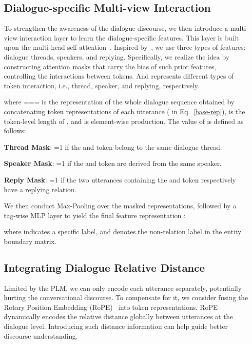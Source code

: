 \documentclass[11pt]{article}
\begin{document}
\vspace{-5pt}
\subsection{Dialogue-specific Multi-view Interaction}

To strengthen the awareness of the dialogue discourse, we then introduce a multi-view interaction layer to learn the dialogue-specific features.
This layer is built upon the multi-head self-attention~\cite{VaswaniSPUJGKP17}.
Inspired by~\cite{ShenCQX21, ZhaoZ0LJW022}, we use three types of features: dialogue threads, speakers, and replying.
Specifically, we realize the idea by constructing attention masks  that carry the bias of such prior features, controlling the interactions between tokens.
And  represents different types of token interaction, i.e., thread, speaker, and replying, respectively. 

where === is the representation of the whole dialogue sequence obtained by concatenating token representations of each utterance ( in Eq.~\eqref{base-rep}),  is the token-level length of ,
and  is element-wise production.
The value of  is defined as follows:

\vspace{2pt}
 \textbf{Thread Mask}: =1 if the  and  token belong to the same dialogue thread.

\vspace{2pt}
 \textbf{Speaker Mask}: =1 if the  and  token are derived from the same speaker.

\vspace{2pt}
 \textbf{Reply Mask}: =1 if the two utterances containing the  and  token respectively have a replying relation.

We then conduct Max-Pooling over the masked representations, followed by a tag-wise MLP layer to yield the final feature representation :

where  indicates a specific label, and  denotes the non-relation label in the entity boundary matrix.

\vspace{-2pt}
\subsection{Integrating Dialogue Relative Distance}

Limited by the PLM, we can only encode each utterance separately, potentially hurting the conversational discourse.
To compensate for it, we consider fusing the Rotary Position Embedding (RoPE)~\cite{abs-2104-09864} into token representations.
RoPE dynamically encodes the relative distance globally between utterances at the dialogue level.
Introducing such distance information can help guide better discourse understanding. 
\end{document}
